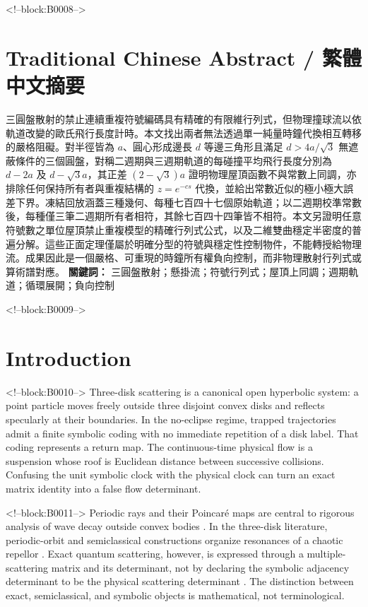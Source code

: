 \documentclass[11pt,a4paper]{article}
\theoremstyle{definition}
\theoremstyle{remark}
\begin{document}
<!--block:B0008-->
\begin{otherlanguage}{chinese-traditional}
\section*{Traditional Chinese Abstract / 繁體中文摘要}
三圓盤散射的禁止連續重複符號編碼具有精確的有限維行列式，但物理撞球流以依軌道改變的歐氏飛行長度計時。本文找出兩者無法透過單一純量時鐘代換相互轉移的嚴格阻礙。對半徑皆為 \(a\)、圓心形成邊長 \(d\) 等邊三角形且滿足 \(d>4a/\sqrt3\) 無遮蔽條件的三個圓盤，對稱二週期與三週期軌道的每碰撞平均飛行長度分別為 \(d-2a\) 及 \(d-\sqrt3a\)，其正差 \((2-\sqrt3)a\) 證明物理屋頂函數不與常數上同調，亦排除任何保持所有者與重複結構的 \(z=e^{-cs}\) 代換，並給出常數近似的極小極大誤差下界。凍結回放涵蓋三種幾何、每種七百四十七個原始軌道；以二週期校準常數後，每種僅三筆二週期所有者相符，其餘七百四十四筆皆不相符。本文另證明任意符號數之單位屋頂禁止重複模型的精確行列式公式，以及二維雙曲穩定半密度的普遍分解。這些正面定理僅屬於明確分型的符號與穩定性控制物件，不能轉授給物理流。成果因此是一個嚴格、可重現的時鐘所有權負向控制，而非物理散射行列式或算術譜對應。
\noindent\textbf{關鍵詞：} 三圓盤散射；懸掛流；符號行列式；屋頂上同調；週期軌道；循環展開；負向控制
\end{otherlanguage}

<!--block:B0009-->
\section{Introduction}

<!--block:B0010-->
Three-disk scattering is a canonical open hyperbolic system: a point particle moves freely outside three disjoint convex disks and reflects specularly at their boundaries. In the no-eclipse regime, trapped trajectories admit a finite symbolic coding with no immediate repetition of a disk label. That coding represents a return map. The continuous-time physical flow is a suspension whose roof is Euclidean distance between successive collisions. Confusing the unit symbolic clock with the physical clock can turn an exact matrix identity into a false flow determinant.

<!--block:B0011-->
Periodic rays and their Poincaré maps are central to rigorous analysis of wave decay outside convex bodies \citep[Introduction and theorem statements]{Ikawa1988}.
In the three-disk literature, periodic-orbit and semiclassical constructions organize resonances of a chaotic repellor \citep[Secs.~II--IV]{GaspardRice1989Semiclassical}.
Exact quantum scattering, however, is expressed through a multiple-scattering matrix and its determinant, not by declaring the symbolic adjacency determinant to be the physical scattering determinant \citep[abstract and Secs.~II--III]{GaspardRice1989Exact}. The distinction between exact, semiclassical, and symbolic objects is mathematical, not terminological.
\end{document}
